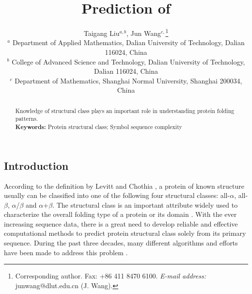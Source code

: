 \documentclass[11pt]{article}
\begin{document}
\begin{CJK*}{GBK}{song}

\newcommand{\lr}[1]{\langle #1 \rangle}
\newcommand{\llr}[1]{\langle\hspace{-2.5pt}\langle #1
\rangle\hspace{-2.5pt}\rangle}

\title{Prediction of } %
\author{
 Taigang Liu$^{a, b}$,
 Jun Wang$^{c, }$\footnote {Corresponding author. Fax: +86 411 8470
 6100.   \emph{E-mail address:} junwang@dlut.edu.cn (J. Wang). }
\\
{\scriptsize $^a\!$ Department of Applied Mathematics, Dalian
University of Technology, Dalian 116024, China} \\
{\scriptsize $^b\!$ College of Advanced Science and Technology,
 Dalian University of Technology, Dalian 116024, China}\\
{\scriptsize $^c\!$ Department of Mathematics, Shanghai Normal
University, Shanghai 200034, China} }

\maketitle \vspace{4mm}

\newpage %

\begin{abstract}  %
Knowledge of structural class plays an important role in
understanding protein folding patterns.
\\[5pt]
{\bf Keywords:} Protein structural class; Symbol sequence complexity
\end{abstract}

\section*{Introduction}     %
According to the definition by Levitt and Chothia \cite{Levitt1976},
a protein of known structure usually can be classified into one of
the following four structural classes: all-$\alpha$, all-$\beta$,
$\alpha$/$\beta$ and $\alpha$+$\beta$. The structural class is an
important attribute widely used to characterize the overall folding
type of a protein or its domain \citep{Chou2005}. With the ever
increasing sequence data, there is a great need to develop reliable
and effective computational methods to predict protein structural
class solely from its primary sequence. During the past three
decades, many different algorithms and efforts have been made to
address this problem \citep{Klein1986,Zhou1998}.



\end{CJK*}
\end{document}
